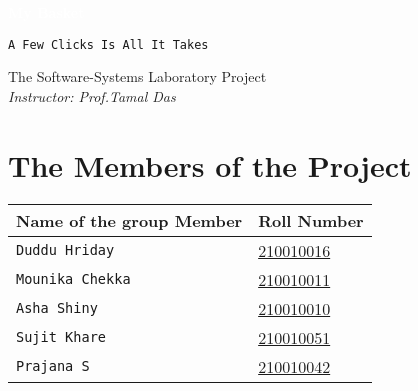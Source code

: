 \documentclass{article}
\begin{document}
\begin{titlepage}
   \begin{center}
       \vspace*{5cm}
\begin{tcolorbox}[colback=blue!60!white,colframe=blue!50!black]
\centering
       \LARGE{\textbf{\textcolor{white}{My Basket}}}
\end{tcolorbox}
       \vspace{0.5cm}
      \texttt{\Large{A Few Clicks Is All It Takes}}
            
       \vspace{7cm}
  \large{ The Software-Systems Laboratory Project\\ \textit{Instructor: Prof.Tamal Das}}
       

       \vfill
            
      
            
   \end{center}
\end{titlepage}
\newpage
\tableofcontents
\newpage
\section{The Members of the Project}

\begin{table}[H]
  \renewcommand\arraystretch{1.6}
    
        \centering
\begin{tabular}{|M{5cm}|M{5cm}|}

\hline
\textbf{\Large{Name of the group Member}} & \Large{\textbf{Roll Number}}\\[50pt]
\hline
\texttt{\Large{Duddu Hriday}} & \href{mailto:210010016@iitdh.ac.in}{\Large{210010016}}\\[50pt]
\hline
\texttt{\Large{Mounika Chekka}} & \href{mailto:210010011@iitdh.ac.in}{\Large{210010011}}\\[50pt]
\hline
\texttt{\Large{Asha Shiny}} & \href{mailto:210010010@iitdh.ac.in}{\Large{210010010}}\\[50pt]
\hline
\texttt{\Large{Sujit Khare}} & \href{mailto:210010051@iitdh.ac.in}{\Large{210010051}}\\[50pt]
\hline
\texttt{\Large{Prajana S}} & \href{mailto:210010042@iitdh.ac.in}{\Large{210010042}}\\[50pt]
\hline
\end{tabular}

\end{table}
\newpage
\end{document}
